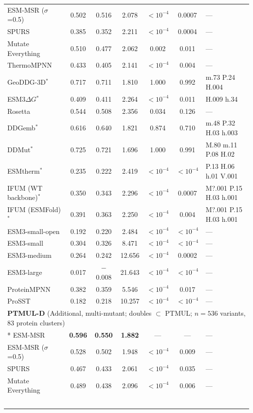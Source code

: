 {\begin{longtable}{lcccccl}
ESM-MSR ($\sigma$=0.5) & 0.502 & 0.516 & 2.078 & $<10^{-4}$ & 0.0007 & --- \\
SPURS & 0.385 & 0.352 & 2.211 & $<10^{-4}$ & 0.0004 & --- \\
Mutate Everything & 0.510 & 0.477 & 2.062 & 0.002 & 0.011 & --- \\
ThermoMPNN & 0.433 & 0.405 & 2.141 & $<10^{-4}$ & 0.004 & --- \\
GeoDDG-3D$^*$ & 0.717 & 0.711 & 1.810 & 1.000 & 0.992 & m.73 P.24 H.004 \\
ESM3$\Delta G$$^*$ & 0.409 & 0.411 & 2.264 & $<10^{-4}$ & 0.011 & H.009 h.34 \\
Rosetta & 0.544 & 0.508 & 2.356 & 0.034 & 0.126 & --- \\
DDGemb$^*$ & 0.616 & 0.640 & 1.821 & 0.874 & 0.710 & m.48 P.32 H.03 h.003 \\
DDMut$^*$ & 0.725 & 0.721 & 1.696 & 1.000 & 0.991 & M.80 m.11 P.08 H.02 \\
ESMtherm$^*$ & 0.235 & 0.222 & 2.419 & $<10^{-4}$ & $<10^{-4}$ & P.13 H.06 h.01 V.001 \\
IFUM (WT backbone)$^*$ & 0.350 & 0.343 & 2.296 & $<10^{-4}$ & 0.0007 & M?.001 P.15 H.03 h.001 \\
IFUM (ESMFold)$^*$ & 0.391 & 0.363 & 2.250 & $<10^{-4}$ & 0.004 & M?.001 P.15 H.03 h.001 \\
ESM3-small-open & 0.192 & 0.220 & 2.484 & $<10^{-4}$ & $<10^{-4}$ & --- \\
ESM3-small & 0.304 & 0.326 & 8.471 & $<10^{-4}$ & $<10^{-4}$ & --- \\
ESM3-medium & 0.264 & 0.242 & 12.656 & $<10^{-4}$ & 0.0002 & --- \\
ESM3-large & 0.017 & $-$0.008 & 21.643 & $<10^{-4}$ & $<10^{-4}$ & --- \\
ProteinMPNN & 0.382 & 0.359 & 5.546 & $<10^{-4}$ & 0.017 & --- \\
ProSST & 0.182 & 0.218 & 10.257 & $<10^{-4}$ & $<10^{-4}$ & --- \\
\midrule
\multicolumn{7}{l}{\textbf{PTMUL-D} (Additional, multi-mutant; doubles $\subset$ PTMUL; $n=536$ variants, 83 protein clusters)} \\*
\midrule
ESM-MSR & \textbf{0.596} & \textbf{0.550} & \textbf{1.882} & --- & --- & --- \\
ESM-MSR ($\sigma$=0.5) & 0.528 & 0.502 & 1.948 & $<10^{-4}$ & 0.009 & --- \\
SPURS & 0.467 & 0.433 & 2.061 & $<10^{-4}$ & 0.035 & --- \\
Mutate Everything & 0.489 & 0.438 & 2.096 & $<10^{-4}$ & 0.006 & --- \\
$$
\end{longtable}}
